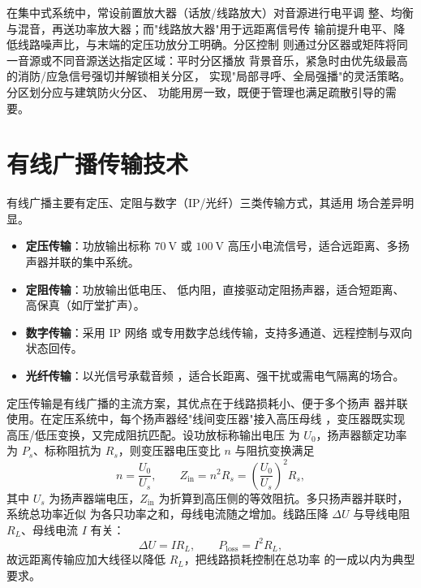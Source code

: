 在集中式系统中，常设前置放大器（话放/线路放大）对音源进行电平调
整、均衡与混音，再送功率放大器；而"线路放大器"用于远距离信号传
输前提升电平、降低线路噪声比，与末端的定压功放分工明确。分区控制
则通过分区器或矩阵将同一音源或不同音源送达指定区域：平时分区播放
背景音乐，紧急时由优先级最高的消防/应急信号强切并解锁相关分区，
实现"局部寻呼、全局强播"的灵活策略。分区划分应与建筑防火分区、
功能用房一致，既便于管理也满足疏散引导的需要。

\section{有线广播传输技术}
\label{sec:wired_broadcast_transmission}

有线广播主要有定压、定阻与数字（IP/光纤）三类传输方式，其适用
场合差异明显。

\begin{itemize}
    \item \textbf{定压传输}：功放输出标称 $
70\ \mathrm{V}$ 或 $100\ \mathrm{
V}$ 高压小电流信号，适合远距离、多扬声器并联的集中系统。
    \item \textbf{定阻传输}：功放输出低电压、
低内阻，直接驱动定阻扬声器，适合短距离、高保真（如厅堂扩声）。
    \item \textbf{数字传输}：采用 IP 网络
或专用数字总线传输，支持多通道、远程控制与双向状态回传。
    \item \textbf{光纤传输}：以光信号承载音频
，适合长距离、强干扰或需电气隔离的场合。
\end{itemize}

定压传输是有线广播的主流方案，其优点在于线路损耗小、便于多个扬声
器并联使用。在定压系统中，每个扬声器经"线间变压器"接入高压母线
，变压器既实现高压/低压变换，又完成阻抗匹配。设功放标称输出电压
为 $U_0$，扬声器额定功率为 $P_s$、标称阻抗为 $R_
s$，则变压器电压变比 $n$ 与阻抗变换满足
\begin{equation}
n = \frac{U_0}{U_s}, \qquad Z_{\mathrm{in}} = n^2 R_s = \left(\frac{U_0}{U_s}\right)^2 R_s,
\end{equation}
其中 $U_s$ 为扬声器端电压，$Z_{\mathrm{in}
}$ 为折算到高压侧的等效阻抗。多只扬声器并联时，系统总功率近似
为各只功率之和，母线电流随之增加。线路压降 $\Delta U$
 与导线电阻 $R_L$、母线电流 $I$ 有关：
\begin{equation}
\Delta U = I R_L, \qquad P_{\mathrm{loss}} = I^2 R_L,
\end{equation}
故远距离传输应加大线径以降低 $R_L$，把线路损耗控制在总功率
的一成以内为典型要求。

